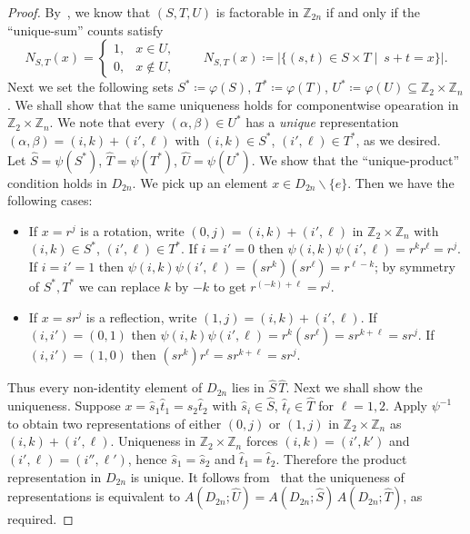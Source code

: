 \documentclass[10pt,a4paper]{amsart}
\newcommand{\Z}{\mathbb{Z}}
\newcommand{\sm}{\smallsetminus}
\begin{document}
\begin{proof}
By~, we know that $(S,T,U)$ is factorable in $\Z_{2n}$ if and only if 
the “unique-sum” counts satisfy
\[
N_{S,T}(x)=
\begin{cases}
1,&x\in U,\\
0,&x\notin U,
\end{cases}
\qquad
N_{S,T}(x)\coloneqq |\{(s,t)\in S\times T\mid \ s+t=x\}|.
\]
Next we set the following sets
$S^*\coloneqq \varphi(S)$, $T^*\coloneqq \varphi(T)$, $U^*\coloneqq \varphi(U)\subseteq\Z_2\times\Z_n$.
We shall show that the same uniqueness holds for componentwise opearation in $\Z_2\times\Z_n$.
We note that every $(\alpha,\beta)\in U^*$ has a \emph{unique} representation
$(\alpha,\beta)=(i,k)+(i',\ell)$ with $(i,k)\in S^*$, $(i',\ell)\in T^*$, as we desired.\\
Let $\widehat S=\psi(S^*)$, $\widehat T=\psi(T^*)$, $\widehat U=\psi(U^*)$.
We show that the “unique-product” condition holds in $D_{2n}$.
We pick up an element $x\in D_{2n}\sm \{e\}$.
Then we have the following cases:
\begin{itemize}
\item If $x=r^j$ is a rotation, write $(0,j)=(i,k)+(i',\ell)$ in $\Z_2\times\Z_n$ with
$(i,k)\in S^*$, $(i',\ell)\in T^*$. If $i=i'=0$ then
$\psi(i,k)\psi(i',\ell)=r^{k}r^{\ell}=r^j$. If $i=i'=1$ then
$\psi(i,k)\psi(i',\ell)=(sr^{k})(sr^{\ell})=r^{\ell-k}$; by symmetry of $S^*,T^*$
we can replace $k$ by $-k$ to get $r^{(-k)+\ell}=r^j$. 
\item If $x=sr^j$ is a reflection, write $(1,j)=(i,k)+(i',\ell)$. If $(i,i')=(0,1)$ then
$\psi(i,k)\psi(i',\ell)=r^{k}(sr^{\ell})=sr^{k+\ell}=sr^j$. 
If $(i,i')=(1,0)$ then
$(sr^{k})r^{\ell}=sr^{k+\ell}=sr^j$.
\end{itemize}

Thus every non-identity element of $D_{2n}$ lies in $\widehat S\,\widehat T$.
Next we shall show the uniqueness.
Suppose $x=\widehat s_1\widehat t_1=\widehat s_2\widehat t_2$ with
$\widehat s_i\in\widehat S$, $\widehat t_{\ell}\in\widehat T$ for $\ell=1,2$.
Apply $\psi^{-1}$ to obtain two representations of either $(0,j)$ or $(1,j)$ in
$\Z_2\times\Z_n$ as $(i,k)+(i',\ell)$. Uniqueness in $\Z_2\times\Z_n$ forces
$(i,k)=(i',k')$ and $(i',\ell)=(i'',\ell')$, hence $\widehat s_1=\widehat s_2$ and
$\widehat t_1=\widehat t_2$. Therefore the product representation in $D_{2n}$ is unique.
It follows from~ that the uniqueness of representations is equivalent to
$A(D_{2n};\widehat U)=A(D_{2n};\widehat S)\,A(D_{2n};\widehat T)$, as required.


\end{proof}
\end{document}
